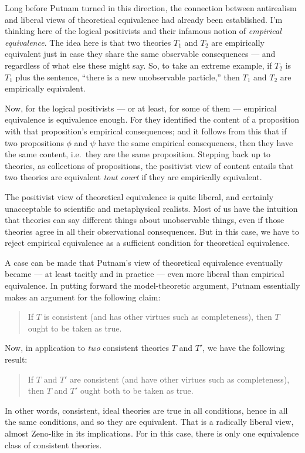 Long before Putnam turned in this direction, the connection between
antirealism and liberal views of theoretical equivalence had already
been established.  I'm thinking here of the logical positivists and
their infamous notion of {\it empirical equivalence}.  The idea here
is that two theories $T_1$ and $T_2$ are empirically equivalent just
in case they share the same observable consequences --- and regardless
of what else these might say.  So, to take an extreme example, if
$T_2$ is $T_1$ plus the sentence, ``there is a new unobservable
particle,'' then $T_1$ and $T_2$ are empirically equivalent.

Now, for the logical positivists --- or at least, for some of them ---
empirical equivalence is equivalence enough.  For they identified the
content of a proposition with that proposition's empirical
consequences; and it follows from this that if two propositions $\phi$
and $\psi$ have the same empirical consequences, then they have the
same content, i.e.\ they are the same proposition.  Stepping back up
to theories, as collections of propositions, the positivist view of
content entails that two theories are equivalent {\it tout court} if
they are empirically equivalent.

The positivist view of theoretical equivalence is quite liberal, and
certainly unacceptable to scientific and metaphysical realists.  Most
of us have the intuition that theories can say different things about
unobservable things, even if those theories agree in all their
observational consequences.  But in this case, we have to reject
empirical equivalence as a sufficient condition for theoretical
equivalence.

A case can be made that Putnam's view of theoretical equivalence
eventually became --- at least tacitly and in practice --- even more
liberal than empirical equivalence.  In putting forward the
model-theoretic argument, Putnam essentially makes an argument for the
following claim:
\begin{quote} If $T$ is consistent (and has other virtues such as
  completeness), then $T$ ought to be taken as true. \end{quote} Now,
in application to {\it two} consistent theories $T$ and $T'$, we have
the following result:
\begin{quote} If $T$ and $T'$ are consistent (and have other virtues
  such as completeness), then $T$ and $T'$ ought both to be taken as
  true.  \end{quote} In other words, consistent, ideal theories are
true in all conditions, hence in all the same conditions, and so they
are equivalent.  That is a radically liberal view, almost Zeno-like in
its implications.  For in this case, there is only one equivalence
class of consistent theories.

